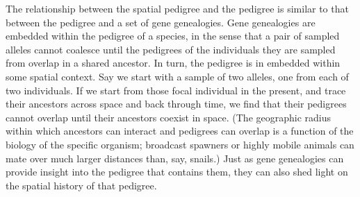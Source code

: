 \documentclass{ar-1col}
\begin{document}
The relationship between the spatial pedigree and the pedigree 
is similar to that between the pedigree and a set of gene genealogies.
Gene genealogies are embedded within the pedigree of a species, 
in the sense that a pair of sampled alleles cannot coalesce until 
the pedigrees of the individuals they are sampled from overlap in a shared ancestor.
In turn, the pedigree is in embedded within some spatial context. 
Say we start with a sample of two alleles, one from each of two individuals.
If we start from those focal individual in the present,
and trace their ancestors across space and back through time, 
we find that their pedigrees cannot overlap until their ancestors coexist in space.
(The geographic radius within which ancestors can interact
and pedigrees can overlap is a function of the biology of the specific organism; 
broadcast spawners or highly mobile animals can mate over much larger distances than, say, snails.)
Just as gene genealogies can provide insight into the pedigree that contains them, 
they can also shed light on the spatial history of that pedigree.
\end{document}
